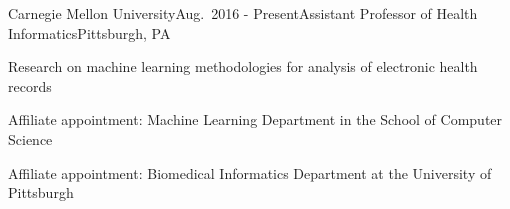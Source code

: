 \begin{rSubsection}{Carnegie Mellon University}{Aug.\ 2016 - Present}{Assistant Professor of Health Informatics}{Pittsburgh, PA}
\item Research on machine learning methodologies for analysis of electronic health records
\item Affiliate appointment: Machine Learning Department in the School of Computer Science
\item Affiliate appointment: Biomedical Informatics Department at the University of Pittsburgh
\end{rSubsection}


